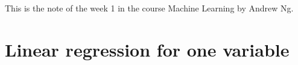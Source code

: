 This is the note of the week 1 in the course Machine Learning by Andrew Ng.
\section{Linear regression for one variable}